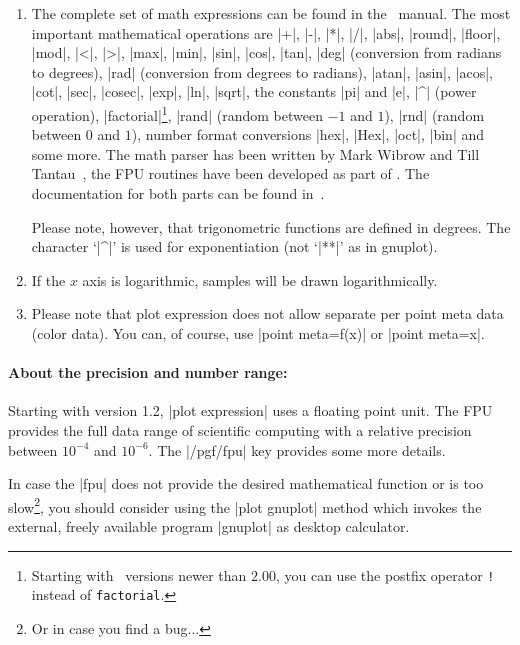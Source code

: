 {\begin{addplotoperation}[]{}{}
\begin{enumerate}
	\item The complete set of math expressions can be found in the \PGF\ manual. The most important mathematical operations are
	|+|, |-|, |*|, |/|, |abs|, |round|, |floor|, |mod|, |<|, |>|, |max|, |min|, |sin|, |cos|, |tan|, |deg| (conversion from radians to degrees), |rad| (conversion from degrees to radians), |atan|, |asin|, |acos|, |cot|, |sec|, |cosec|, |exp|, |ln|, |sqrt|, the constants |pi| and |e|, |^| (power operation), |factorial|\footnote{Starting with \PGF\ versions newer than $2.00$, you can use the postfix operator \texttt{!} instead of \texttt{factorial}.}, |rand| (random between $-1$ and $1$), |rnd| (random between $0$ and $1$), number format conversions |hex|, |Hex|, |oct|, |bin| and some more. The math parser has been written by Mark Wibrow and Till Tantau~\cite{tikz}, the FPU routines have been developed as part of \PGFPlots. The documentation for both parts can be found in~\cite{tikz}.
	
	Please note, however, that trigonometric functions are defined in degrees. The character `|^|' is used for exponentiation (not `|**|' as in gnuplot).

	\item If the $x$ axis is logarithmic, samples will be drawn logarithmically.

	\item Please note that plot expression does not allow separate per point meta data (color data). You can, of course, use |point meta=f(x)| or |point meta=x|.
\end{enumerate}

\paragraph{About the precision and number range:}
%
%
	 Starting with version 1.2, |plot expression| uses a floating point unit. The FPU provides the full data range of scientific computing with a relative precision between $10^{-4}$ and $10^{-6}$. The |/pgf/fpu| key provides some more details. 

	In case the |fpu| does not provide the desired mathematical function or is too slow\footnote{Or in case you find a bug$\dotsc$}, you should consider using the |plot gnuplot| method which invokes the external, freely available program |gnuplot| as desktop calculator. 

\begin{codeexample}[]
\end{codeexample}


\end{addplotoperation}}
